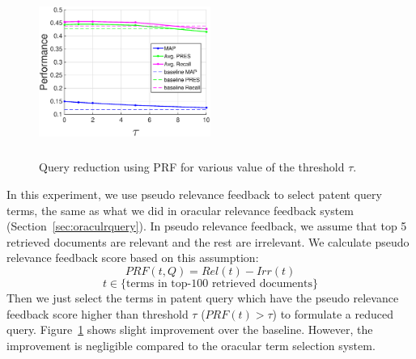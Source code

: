 \begin{figure}[t!]
   \centering
   \includegraphics[width=0.50\textwidth,height=55mm]{figs/prf.eps}
   \caption{Query reduction using PRF for various value of the threshold $\tau$.}   
   \label{fig:prf} 
\end{figure}
In this experiment, we use pseudo relevance feedback to select patent query terms, the same as what we did in oracular relevance feedback system (Section~\ref{sec:oraculrquery}). In pseudo relevance feedback, we assume that top 5 retrieved documents are relevant and the rest are irrelevant. We calculate pseudo relevance feedback score based on this assumption:  
\begin{equation}
PRF(t,Q)=Rel(t)-Irr(t) 
 \label{eq:score}
\end{equation}
\vspace*{-2ex}
\begin{displaymath}t\in \lbrace \mbox{terms in top-100 retrieved documents}\rbrace\end{displaymath}
Then we just select the terms in patent query which have the pseudo relevance feedback score higher than threshold $\tau$ ($PRF(t)>\tau$) to formulate a reduced query. Figure~\ref{fig:prf} shows slight improvement over the baseline. However, the improvement is negligible compared to the oracular term selection system.
